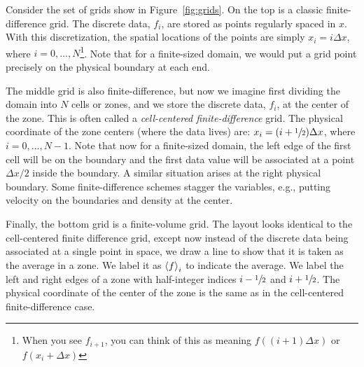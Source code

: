 Consider the set of grids show in Figure~\ref{fig:grids}.  On the top
is a classic finite-difference grid.  The discrete data, $f_i$, are
stored as points regularly spaced in $x$.  With this discretization,
the spatial locations of the points are simply $x_i = i \Delta x$,
where $i = 0, \ldots, N$\footnote{When you see $f_{i+1}$, you can
  think of this as meaning $f((i+1)\Delta x)$ or $f(x_i + \Delta x)$}.
Note that for a finite-sized domain, we would put a grid point
precisely on the physical boundary at each end.

The middle grid is also finite-difference, but now we imagine first
dividing the domain into $N$ cells or zones, and we store the discrete
data, $f_i$, at the center of the zone.  This is often called a {\em
  cell-centered finite-difference} grid.  The physical coordinate of
the zone centers (where the data lives) are: $x_i = (i + {\sfrac{1}{2}})\Delta
x$, where $i = 0, \ldots, N-1$.  Note that now for a finite-sized
domain, the left edge of the first cell will be on the boundary and
the first data value will be associated at a point $\Delta x/2$ inside
the boundary.  A similar situation arises at the right physical
boundary.  Some finite-difference schemes stagger the variables,
e.g., putting velocity on the boundaries and density at the center.

Finally, the bottom grid is a finite-volume grid.  The layout looks
identical to the cell-centered finite difference grid, except now
instead of the discrete data being associated at a single point in
space, we draw a line to show that it is taken as the average in a
zone.  We label it as ${\langle f\rangle}_i$ to indicate the average.
We label the left and right edges of a zone with half-integer indices
$i-{\sfrac{1}{2}}$ and $i+{\sfrac{1}{2}}$.  The physical coordinate of the center of the zone
is the same as in the cell-centered finite-difference case.


